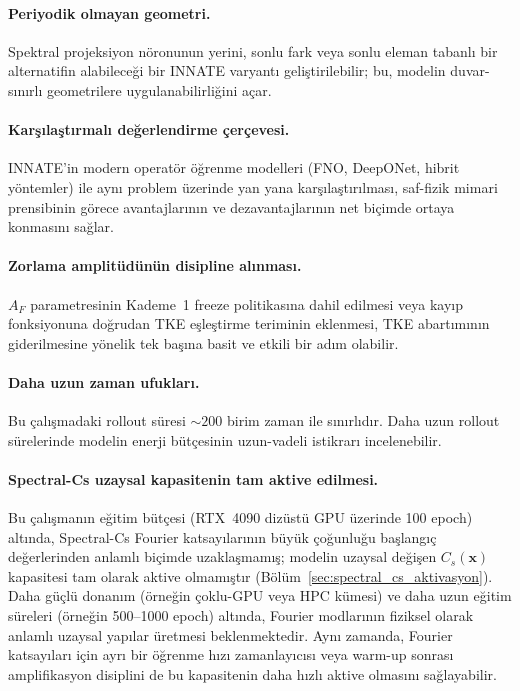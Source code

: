 \paragraph{Periyodik olmayan geometri.} Spektral projeksiyon nöronunun yerini, sonlu fark veya sonlu eleman tabanlı bir alternatifin alabileceği bir INNATE varyantı geliştirilebilir; bu, modelin duvar-sınırlı geometrilere uygulanabilirliğini açar.

\paragraph{Karşılaştırmalı değerlendirme çerçevesi.} INNATE'in modern operatör öğrenme modelleri (FNO, DeepONet, hibrit yöntemler) ile aynı problem üzerinde yan yana karşılaştırılması, saf-fizik mimari prensibinin görece avantajlarının ve dezavantajlarının net biçimde ortaya konmasını sağlar.

\paragraph{Zorlama amplitüdünün disipline alınması.} $A_{F}$ parametresinin Kademe~1 freeze politikasına dahil edilmesi veya kayıp fonksiyonuna doğrudan TKE eşleştirme teriminin eklenmesi, TKE abartımının giderilmesine yönelik tek başına basit ve etkili bir adım olabilir.

\paragraph{Daha uzun zaman ufukları.} Bu çalışmadaki rollout süresi $\sim 200$ birim zaman ile sınırlıdır. Daha uzun rollout sürelerinde modelin enerji bütçesinin uzun-vadeli istikrarı incelenebilir.

\paragraph{Spectral-Cs uzaysal kapasitenin tam aktive edilmesi.} Bu çalışmanın eğitim bütçesi (RTX~4090 dizüstü GPU üzerinde 100 epoch) altında, Spectral-Cs Fourier katsayılarının büyük çoğunluğu başlangıç değerlerinden anlamlı biçimde uzaklaşmamış; modelin uzaysal değişen $C_{s}(\mathbf{x})$ kapasitesi tam olarak aktive olmamıştır (Bölüm~\ref{sec:spectral_cs_aktivasyon}). Daha güçlü donanım (örneğin çoklu-GPU veya HPC kümesi) ve daha uzun eğitim süreleri (örneğin 500--1000 epoch) altında, Fourier modlarının fiziksel olarak anlamlı uzaysal yapılar üretmesi beklenmektedir. Aynı zamanda, Fourier katsayıları için ayrı bir öğrenme hızı zamanlayıcısı veya warm-up sonrası amplifikasyon disiplini de bu kapasitenin daha hızlı aktive olmasını sağlayabilir.


